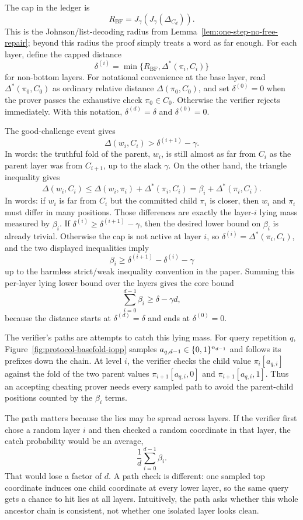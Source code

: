 The cap in the ledger is
\[
  R_{\mathrm{BF}}
  =
  J_\gamma(J_\gamma(\Delta_{C_d})).
\]
This is the Johnson/list-decoding radius from
Lemma~\ref{lem:one-step-no-free-repair}; beyond this radius the proof simply
treats a word as far enough.  For each layer, define the capped distance
\[
  \delta^{(i)}
  =
  \min\{R_{\mathrm{BF}},\Delta^*(\pi_i,C_i)\}
\]
for non-bottom layers.  For notational convenience at the base layer, read
$\Delta^*(\pi_0,C_0)$ as ordinary relative distance $\Delta(\pi_0,C_0)$, and set
$\delta^{(0)}=0$ when the prover passes the exhaustive check $\pi_0\in C_0$.
Otherwise the verifier rejects immediately.  With this notation,
$\delta^{(d)}=\delta$ and $\delta^{(0)}=0$.

The good-challenge event gives
\[
  \Delta(w_i,C_i)>\delta^{(i+1)}-\gamma.
\]
In words: the truthful fold of the parent, $w_i$, is still almost as far from
$C_i$ as the parent layer was from $C_{i+1}$, up to the slack $\gamma$.
On the other hand, the triangle inequality gives
\[
  \Delta(w_i,C_i)
  \le
  \Delta(w_i,\pi_i)+\Delta^*(\pi_i,C_i)
  =
  \beta_i+\Delta^*(\pi_i,C_i).
\]
In words: if $w_i$ is far from $C_i$ but the committed child $\pi_i$ is closer,
then $w_i$ and $\pi_i$ must differ in many positions.  Those differences are
exactly the layer-$i$ lying mass measured by $\beta_i$.
If $\delta^{(i)}\ge \delta^{(i+1)}-\gamma$, then the desired lower bound on
$\beta_i$ is already trivial.  Otherwise the cap is not active at layer $i$, so
$\delta^{(i)}=\Delta^*(\pi_i,C_i)$, and the two displayed inequalities imply
\[
  \beta_i \ge \delta^{(i+1)}-\delta^{(i)}-\gamma
\]
up to the harmless strict/weak inequality convention in the paper.  Summing this
per-layer lying lower bound over the layers gives the core bound
\[
  \sum_{i=0}^{d-1}\beta_i \ge \delta-\gamma d,
\]
because the distance starts at $\delta^{(d)}=\delta$ and ends at
$\delta^{(0)}=0$.

The verifier's paths are attempts to catch this lying mass.  For query repetition
$q$, Figure~\ref{fig:protocol-basefold-iopp} samples
$a_{q,d-1}\in\{0,1\}^{n_{d-1}}$ and follows its prefixes down the chain.  At level
$i$, the verifier checks the child value $\pi_i[a_{q,i}]$ against the fold of
the two parent values $\pi_{i+1}[a_{q,i},0]$ and
$\pi_{i+1}[a_{q,i},1]$.  Thus an accepting cheating prover needs every sampled
path to avoid the parent-child positions counted by the $\beta_i$ terms.

The path matters because the lies may be spread across layers.  If the
verifier first chose a random layer $i$ and then checked a random coordinate in
that layer, the catch probability would be an average,
\[
  \frac{1}{d}\sum_{i=0}^{d-1}\beta_i.
\]
That would lose a factor of $d$.  A path check is different: one sampled top
coordinate induces one child coordinate at every lower layer, so the same query
gets a chance to hit lies at all layers.  Intuitively, the path asks
whether this whole ancestor chain is consistent, not whether one isolated layer
looks clean.

